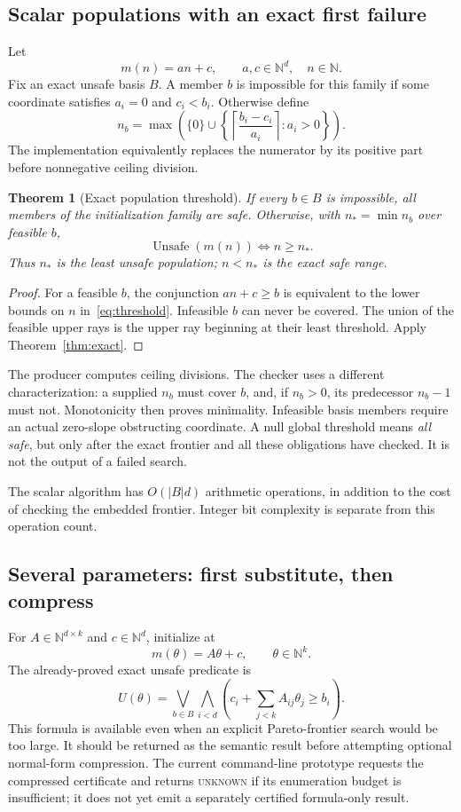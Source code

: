 \documentclass[11pt,a4paper]{article}
\newcommand{\N}{\mathbb N}
\newcommand{\Unsafe}{\operatorname{Unsafe}}
\newcommand{\unknown}{\textsc{unknown}}
\newtheorem{theorem}{Theorem}[section]
\theoremstyle{definition}
\theoremstyle{remark}
\begin{document}
\subsection{Scalar populations with an exact first failure}
Let
\[
 m(n)=an+c,\qquad a,c\in\N^d,\quad n\in\N.
\]
Fix an exact unsafe basis $B$. A member $b$ is impossible for this family if some coordinate satisfies $a_i=0$ and $c_i<b_i$. Otherwise define
\begin{equation}\label{eq:threshold}
 n_b=\max\left(\{0\}\cup
 \left\{\left\lceil\frac{b_i-c_i}{a_i}\right\rceil:a_i>0\right\}\right).
\end{equation}
The implementation equivalently replaces the numerator by its positive part before nonnegative ceiling division.

\begin{theorem}[Exact population threshold]\label{thm:threshold}
If every $b\in B$ is impossible, all members of the initialization family are safe. Otherwise, with $n_*=\min n_b$ over feasible $b$,
\[
 \Unsafe(m(n))\iff n\ge n_*.
\]
Thus $n_*$ is the least unsafe population; $n<n_*$ is the exact safe range.
\end{theorem}
\begin{proof}
For a feasible $b$, the conjunction $an+c\ge b$ is equivalent to the lower bounds on $n$ in~\eqref{eq:threshold}. Infeasible $b$ can never be covered. The union of the feasible upper rays is the upper ray beginning at their least threshold. Apply Theorem~\ref{thm:exact}.
\end{proof}

The producer computes ceiling divisions. The checker uses a different characterization: a supplied $n_b$ must cover $b$, and, if $n_b>0$, its predecessor $n_b-1$ must not. Monotonicity then proves minimality. Infeasible basis members require an actual zero-slope obstructing coordinate. A null global threshold means \emph{all safe}, but only after the exact frontier and all these obligations have checked. It is not the output of a failed search.

The scalar algorithm has $O(|B|d)$ arithmetic operations, in addition to the cost of checking the embedded frontier. Integer bit complexity is separate from this operation count.

\subsection{Several parameters: first substitute, then compress}
For $A\in\N^{d\times k}$ and $c\in\N^d$, initialize at
\[
 m(\theta)=A\theta+c,\qquad\theta\in\N^k.
\]
The already-proved exact unsafe predicate is
\begin{equation}\label{eq:paramformula}
 U(\theta)=\bigvee_{b\in B}\bigwedge_{i<d}
 \left(c_i+\sum_{j<k}A_{ij}\theta_j\ge b_i\right).
\end{equation}
This formula is available even when an explicit Pareto-frontier search would be too large. It should be returned as the semantic result before attempting optional normal-form compression. The current command-line prototype requests the compressed certificate and returns \unknown{} if its enumeration budget is insufficient; it does not yet emit a separately certified formula-only result.
\end{document}
